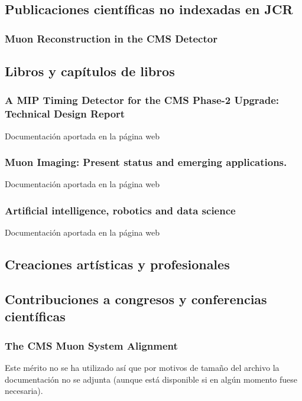 \documentclass[a4paper, 11pt, twoside, openright]{report}
\begin{document}
\subsection{Publicaciones científicas no indexadas en JCR}

\subsubsection{Muon Reconstruction in the CMS Detector}


\subsection{Libros y capítulos de libros}
\subsubsection{A MIP Timing Detector for the CMS Phase-2 Upgrade: Technical Design Report}
%
Documentación aportada en la página web

\subsubsection{Muon Imaging: Present status and emerging applications.}
%
Documentación aportada en la página web

\subsubsection{Artificial intelligence, robotics and data science}
%
Documentación aportada en la página web


\subsection{Creaciones artísticas y profesionales}

\subsection{Contribuciones a congresos y conferencias científicas}

\subsubsection{The CMS Muon System Alignment}

Este mérito no se ha utilizado así que por motivos de tamaño del archivo la documentación no se adjunta (aunque está disponible si en algún momento fuese necesaria).
\end{document}
